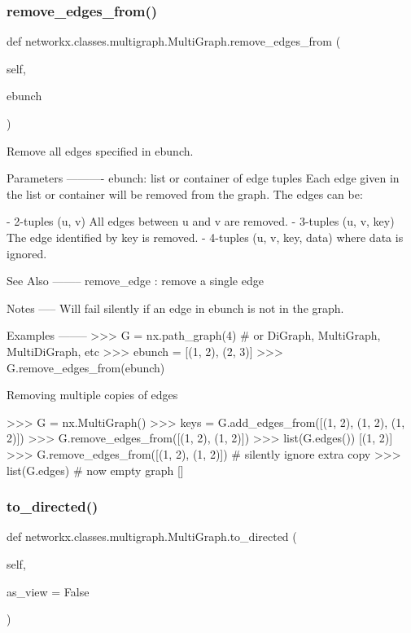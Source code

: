 \subsubsection{\texorpdfstring{remove\+\_\+edges\+\_\+from()}{remove\_edges\_from()}}
{\footnotesize\ttfamily def networkx.\+classes.\+multigraph.\+Multi\+Graph.\+remove\+\_\+edges\+\_\+from (\begin{DoxyParamCaption}\item[{}]{self,  }\item[{}]{ebunch }\end{DoxyParamCaption})}

\begin{DoxyVerb}Remove all edges specified in ebunch.

Parameters
----------
ebunch: list or container of edge tuples
    Each edge given in the list or container will be removed
    from the graph. The edges can be:

- 2-tuples (u, v) All edges between u and v are removed.
- 3-tuples (u, v, key) The edge identified by key is removed.
- 4-tuples (u, v, key, data) where data is ignored.

See Also
--------
remove_edge : remove a single edge

Notes
-----
Will fail silently if an edge in ebunch is not in the graph.

Examples
--------
>>> G = nx.path_graph(4)  # or DiGraph, MultiGraph, MultiDiGraph, etc
>>> ebunch = [(1, 2), (2, 3)]
>>> G.remove_edges_from(ebunch)

Removing multiple copies of edges

>>> G = nx.MultiGraph()
>>> keys = G.add_edges_from([(1, 2), (1, 2), (1, 2)])
>>> G.remove_edges_from([(1, 2), (1, 2)])
>>> list(G.edges())
[(1, 2)]
>>> G.remove_edges_from([(1, 2), (1, 2)])  # silently ignore extra copy
>>> list(G.edges)  # now empty graph
[]
\end{DoxyVerb}
 \mbox{\label{classnetworkx_1_1classes_1_1multigraph_1_1MultiGraph_a1554db7ceb80fe185bf1572bc310f225}} 
\subsubsection{\texorpdfstring{to\+\_\+directed()}{to\_directed()}}
{\footnotesize\ttfamily def networkx.\+classes.\+multigraph.\+Multi\+Graph.\+to\+\_\+directed (\begin{DoxyParamCaption}\item[{}]{self,  }\item[{}]{as\+\_\+view = {\ttfamily False} }\end{DoxyParamCaption})}

